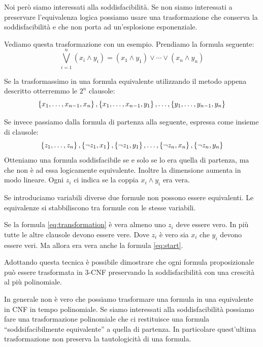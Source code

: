 Noi però siamo interessati alla soddisfacibilità. Se non siamo interessati a preservare
l'equivalenza logica possiamo usare una trasformazione che conserva la soddisfacibilità e che non
porta ad un'esplosione esponenziale.

Vediamo questa trasformazione con un esempio. Prendiamo la formula seguente:
\begin{equation}\label{eq:start}
    \bigvee_{i=1}^{n}(x_{i}\land y_{i}) = (x_{1} \land y_{1}) \lor \cdots \lor (x_{n} \land y_{n})
\end{equation}

Se la trasformassimo in una formula equivalente utilizzando il metodo appena descritto otterremmo le
$2^{n}$ clausole:
\begin{equation*}
    \left\{x_{1},\dotsc,x_{n-1},x_{n}\right\},\left\{x_{1},\dotsc,x_{n-1},y_{1}\right\},\dotsc,\left\{y_{1},\dotsc,y_{n-1},y_{n}\right\}
\end{equation*}

Se invece passiamo dalla formula di partenza alla seguente, espressa come insieme di clausole:
\begin{equation}\label{eq:transformation}
    \left\{z_{1},\dotsc,z_{n}\right\},\left\{\lnot z_{1},x_{1}\right\},\left\{\lnot z_{1},y_{1}\right\},\dotsc,\left\{\lnot
    z_{n},x_{n}\right\},\left\{\lnot z_{n},y_{n}\right\}
\end{equation}
Otteniamo una formula soddisfacibile se e solo se lo era quella di partenza, ma che non è ad essa
logicamente equivalente.  Inoltre la dimensione aumenta in modo lineare.  Ogni $z_{i}$ ci indica se
la coppia $x_{i} \land y_{i}$ era vera.

Se introduciamo variabili diverse due formule non possono essere equivalenti. Le equivalenze si
stabbiliscono tra formule con le stesse variabili.

Se la formula \ref{eq:transformation} è vera almeno uno $z_{i}$ deve essere vero. In più tutte le
altre clausole devono essere vere. Dove $z_{i}$ è vero sia $x_{i}$ che $y_{i}$ devono essere veri.
Ma allora era vera anche la formula \ref{eq:start}.

Adottando questa tecnica è possibile dimostrare che ogni formula proposizionale può essere
trasformata in 3-CNF preservando la soddisfacibilità con una crescità al più polinomiale.

In generale non è vero che possiamo trasformare una formula in una equivalente in CNF in tempo
polinomiale. Se siamo interessati alla soddisfacibilità possiamo fare una trasformazione
polinomiale che ci restituisce una formula ``soddsifacibilmente equivalente'' a quella di partenza.
In particolare quest'ultima trasformazione non preserva la tautologicità di una formula.

